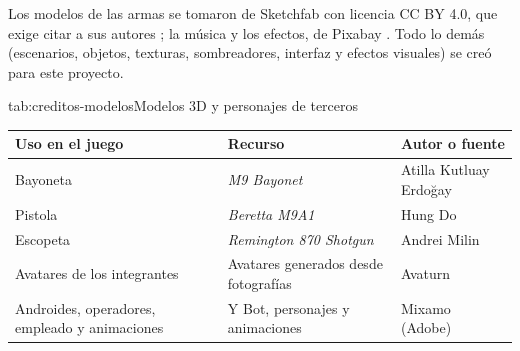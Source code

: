 
Los modelos de las armas se tomaron de Sketchfab con licencia CC BY 4.0, que exige citar a sus
autores \parencite{ccby40}; la música y los efectos, de Pixabay \parencite{pixabaylicencia}. Todo lo
demás (escenarios, objetos, texturas, sombreadores, interfaz y efectos visuales) se creó para este
proyecto.

\begin{TablaAPA}{tab:creditos-modelos}{Modelos 3D y personajes de terceros}
\begin{tabularx}{\linewidth}{P{4.4cm}LP{3.4cm}}
\toprule
Uso en el juego & Recurso & Autor o fuente \\
\midrule
Bayoneta & \textit{M9 Bayonet} \parencite{erdogay_m9} & Atilla Kutluay Erdoğay \\
Pistola & \textit{Beretta M9A1} \parencite{do_m9a1} & Hung Do \\
Escopeta & \textit{Remington 870 Shotgun} \parencite{milin_870} & Andrei Milin \\
Avatares de los integrantes & Avatares generados desde fotografías & Avaturn \\
Androides, operadores, empleado y animaciones & Y Bot, personajes y animaciones & Mixamo (Adobe) \\
\bottomrule
\end{tabularx}
\end{TablaAPA}

